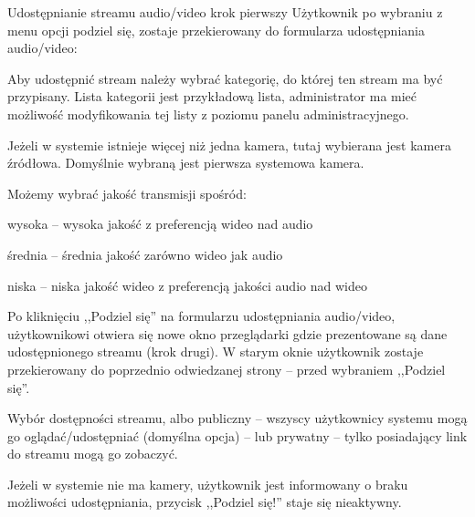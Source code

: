 \begin{userstory}{Udostępnianie streamu audio/video krok pierwszy}
    Użytkownik po wybraniu z menu opcji podziel się,
    zostaje przekierowany do formularza udostępniania audio/video:
    \begin{packed_enum}
        \item {Aby udostępnić stream należy wybrać kategorię, do której ten stream ma być przypisany. Lista kategorii jest przykładową lista, administrator ma mieć możliwość modyfikowania tej listy z poziomu panelu administracyjnego.}
        \item {Jeżeli w systemie istnieje więcej niż jedna kamera, tutaj wybierana jest kamera źródłowa. Domyślnie wybraną jest pierwsza systemowa kamera.}
        \item {Możemy wybrać jakość transmisji spośród:
            \begin{packed_item}
                \item{wysoka -- wysoka jakość z preferencją wideo nad audio}
                \item{średnia -- średnia jakość zarówno wideo jak audio}
                \item{niska -- niska jakość wideo z preferencją jakości audio nad wideo}
            \end{packed_item}
        }
        \item{Po kliknięciu ,,Podziel się'' na formularzu udostępniania audio/video, użytkownikowi otwiera się nowe okno przeglądarki gdzie prezentowane są dane udostępnionego streamu (krok drugi). W starym oknie użytkownik zostaje przekierowany do poprzednio odwiedzanej strony -- przed wybraniem ,,Podziel się''.}
        \item {Wybór dostępności streamu, albo publiczny -- wszyscy użytkownicy systemu mogą go oglądać/udostępniać (domyślna opcja) -- lub prywatny -- tylko posiadający link do streamu mogą go zobaczyć.}
    \end{packed_enum}
    \begin{tests}
        \item{Jeżeli w systemie nie ma kamery, użytkownik jest informowany o braku możliwości udostępniania, przycisk ,,Podziel się!'' staje się nieaktywny.}
    \end{tests}
\end{userstory}

